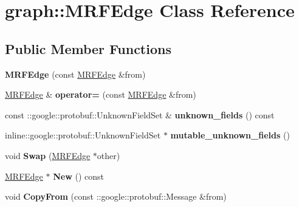 \hypertarget{classgraph_1_1MRFEdge}{
\section{graph::MRFEdge Class Reference}
\label{classgraph_1_1MRFEdge}
}
\subsection*{Public Member Functions}
\begin{DoxyCompactItemize}
\item 
\hypertarget{classgraph_1_1MRFEdge_aa09de56220ba0cb66c9fd9228ba4d221}{
{\bfseries MRFEdge} (const \hyperlink{classgraph_1_1MRFEdge}{MRFEdge} \&from)}
\label{classgraph_1_1MRFEdge_aa09de56220ba0cb66c9fd9228ba4d221}

\item 
\hypertarget{classgraph_1_1MRFEdge_a3b97945487b8335d0a845629dd61aa9a}{
\hyperlink{classgraph_1_1MRFEdge}{MRFEdge} \& {\bfseries operator=} (const \hyperlink{classgraph_1_1MRFEdge}{MRFEdge} \&from)}
\label{classgraph_1_1MRFEdge_a3b97945487b8335d0a845629dd61aa9a}

\item 
\hypertarget{classgraph_1_1MRFEdge_a291edbf56dd75cfc07882c224d78f6f2}{
const ::google::protobuf::UnknownFieldSet \& {\bfseries unknown\_\-fields} () const }
\label{classgraph_1_1MRFEdge_a291edbf56dd75cfc07882c224d78f6f2}

\item 
\hypertarget{classgraph_1_1MRFEdge_aaf28e2100240ef4b97bff1970da1bbae}{
inline::google::protobuf::UnknownFieldSet $\ast$ {\bfseries mutable\_\-unknown\_\-fields} ()}
\label{classgraph_1_1MRFEdge_aaf28e2100240ef4b97bff1970da1bbae}

\item 
\hypertarget{classgraph_1_1MRFEdge_afded0d8d16e77ef81e494cbdad220734}{
void {\bfseries Swap} (\hyperlink{classgraph_1_1MRFEdge}{MRFEdge} $\ast$other)}
\label{classgraph_1_1MRFEdge_afded0d8d16e77ef81e494cbdad220734}

\item 
\hypertarget{classgraph_1_1MRFEdge_ae8c0c207131d9c4f8d65d2e6ed0d8257}{
\hyperlink{classgraph_1_1MRFEdge}{MRFEdge} $\ast$ {\bfseries New} () const }
\label{classgraph_1_1MRFEdge_ae8c0c207131d9c4f8d65d2e6ed0d8257}

\item 
\hypertarget{classgraph_1_1MRFEdge_a65ec5aa99bae52421400d4b456955ce6}{
void {\bfseries CopyFrom} (const ::google::protobuf::Message \&from)}
\label{classgraph_1_1MRFEdge_a65ec5aa99bae52421400d4b456955ce6}


\end{DoxyCompactItemize}
